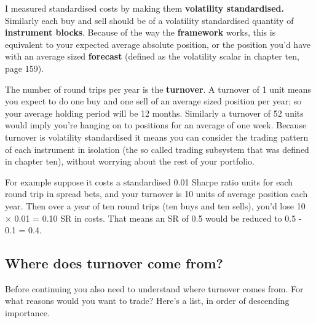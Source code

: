 I measured standardised costs by making them \textbf{volatility standardised.} Similarly each buy and sell should be of a volatility standardised quantity of \textbf{instrument blocks}. Because of the way the \textbf{framework} works, this is equivalent to your expected average absolute position, or the position you'd have with an average sized \textbf{forecast} (defined as the volatility scalar in chapter ten, page 159).

The number of round trips per year is the \textbf{turnover}. A turnover of 1 unit means you expect to do one buy and one sell of an average sized position per year; so your average holding period will be 12 months. Similarly a turnover of 52 units would imply you're hanging on to positions for an average of one week. Because turnover is volatility standardised it means you can consider the trading pattern of each instrument in isolation (the so called trading subsystem that was defined in chapter ten), without worrying about the rest of your portfolio.

For example suppose it costs a standardised 0.01 Sharpe ratio units for each round trip in spread bets, and your turnover is 10 units of average position each year. Then over a year of ten round trips (ten buys and ten sells), you'd lose 10 × 0.01 = 0.10 SR in costs. That means an SR of 0.5 would be reduced to 0.5 - 0.1 = 0.4.

\subsection*{Where does turnover come from?}

Before continuing you also need to understand where turnover comes from. For what reasons would you want to trade? Here's a list, in order of descending importance.

